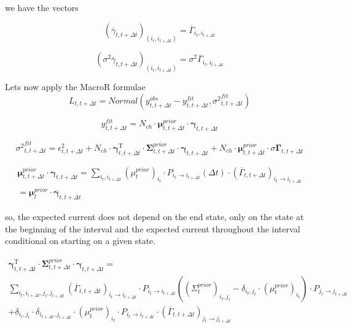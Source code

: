 \documentclass[pdflatex,sn-mathphys-num]{sn-jnl}%
\theoremstyle{thmstyleone}%
\theoremstyle{thmstyletwo}%
\theoremstyle{thmstylethree}%
\begin{document}
we have the vectors 

\begin{equation}
	({\overline \gamma}_{t,t+\Delta t })_{(i_t, i_{t+\Delta t})} = {\overline \Gamma}_{i_t,i_{t+\Delta t}}
\end{equation}

\begin{equation}
	(\sigma^2{\overline \gamma}_{t,t+\Delta t })_{(i_t, i_{t+\Delta t})} = \sigma^2{\overline \Gamma}_{i_t,i_{t+\Delta t}}
\end{equation}

Lets now apply the MacroR formulae
\begin{equation}
	L_{t, t+\Delta t}= Normal (y^{obs}_{t, t+\Delta t}-y^{fit}_{t, t+\Delta t}, {\sigma^{2}}^{fit}_{t, t+\Delta t})
\end{equation}

\begin{equation}
	y^{fit}_{t,t+\Delta t} = N_{ch} \cdot \mathbf \mu^{prior}_{t,t+\Delta t} \cdot \mathbf \gamma_{t,t+\Delta t}
\end{equation}

\begin{equation}
	{\sigma^2}^{fit}_{t, t+\Delta t}
	= \epsilon^2_{t, t+\Delta t} +N_{ch} \cdot {\mathbf \gamma}^{\mathrm{T}}_{t, t+\Delta t} \cdot \mathbf \Sigma^{prior}_{t, t+\Delta t} \cdot \mathbf \gamma_{t, t+\Delta t}
	+ N_{ch} \cdot \mathbf \mu^{prior}_{t, t+\Delta t} \cdot {\sigma \mathbf  \Gamma}_{t, t+\Delta t}
\end{equation}

\begin{multline}
	\mathbf \mu^{prior}_{t,t+\Delta t} \cdot \mathbf \gamma_{t,t+\Delta t} =
	\sum_{i_t, i_{t+ \Delta t}} {(\mu^{prior}_{t})_{i_t}  \cdot P_{i_t \rightarrow i_{t+ \Delta t}}(\Delta t) \cdot ({\overline \Gamma_{t,t + \Delta t}})_{i_t \rightarrow i_{t+\Delta t}}}\\= \mathbf \mu^{prior}_t \cdot  \overline {\mathbf \gamma}_{t, t+\Delta t}
\end{multline}






so, the expected current does not depend on the end state, only on the state at the beginning of the interval and the expected current throughout the interval conditional on starting on a given state. 

\begin{multline}
	{\mathbf \gamma}^{\mathrm{T}}_{t, t+\Delta t} \cdot \mathbf \Sigma^{prior}_{t, t+\Delta t} \cdot \mathbf \gamma_{t, t+\Delta t}= \\
	\sum_{i_t, i_{t +\Delta t},j_t, j_{t +\Delta t}}
	({\overline \Gamma_{t,t + \Delta t}})_{i_t \rightarrow i_{t+\Delta t}} \cdot 
	P_{i_t \rightarrow i_{t+ \Delta t}} \left((\Sigma^{prior}_{t})_{i_t ,j_t} - \delta_{i_t, j_t} \cdot (\mu^{prior}_t)_{i_t} \right)  \cdot P_{j_t \rightarrow j_{t+ \Delta t}} \\+\delta_{i_t, j_t} \cdot \delta_{i_{t+ \Delta t}, j_{t+ \Delta t}} \cdot (\mu^{prior}_t)_{i_t}\cdot P_{i_t \rightarrow i_{t+ \Delta t}} 
	\cdot 
	({\overline \Gamma_{t,t + \Delta t}})_{j_t \rightarrow j_{t+\Delta t}} 
\end{multline}
\end{document}
